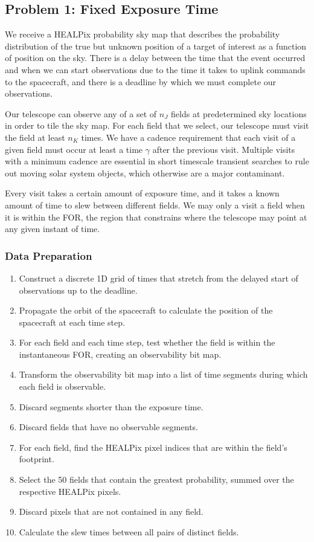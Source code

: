 \documentclass[twocolumn,times]{aastex631}
\begin{document}
\subsection{Problem 1: Fixed Exposure Time}
\label{sec:fixed-exptime}

We receive a \ac{HEALPix} probability sky map that describes the probability distribution of the true but unknown position of a target of interest as a function of position on the sky. There is a delay between the time that the event occurred and when we can start observations due to the time it takes to uplink commands to the spacecraft, and there is a deadline by which we must complete our observations.

Our telescope can observe any of a set of $n_J$ fields at predetermined sky locations in order to tile the sky map. For each field that we select, our telescope must visit the field at least $n_K$ times. We have a cadence requirement that each visit of a given field must occur at least a time $\gamma$ after the previous visit. Multiple visits with a minimum cadence are essential in short timescale transient searches to rule out moving solar system objects, which otherwise are a major contaminant.

Every visit takes a certain amount of exposure time, and it takes a known amount of time to slew between different fields. We may only a visit a field when it is within the \ac{FOR}, the region that constrains where the telescope may point at any given instant of time.

\subsubsection{Data Preparation}

\begin{enumerate}
    \item Construct a discrete 1D grid of times that stretch from the delayed start of observations up to the deadline.
    \item Propagate the orbit of the spacecraft to calculate the position of the spacecraft at each time step.
    \item For each field and each time step, test whether the field is within the instantaneous \ac{FOR}, creating an observability bit map.
    \item Transform the observability bit map into a list of time segments during which each field is observable.
    \item Discard segments shorter than the exposure time.
    \item Discard fields that have no observable segments.
    \item For each field, find the \ac{HEALPix} pixel indices that are within the field's footprint.
    \item Select the 50 fields that contain the greatest probability, summed over the respective \ac{HEALPix} pixels.
    \item Discard pixels that are not contained in any field.
    \item Calculate the slew times between all pairs of distinct fields.
\end{enumerate}
\end{document}

